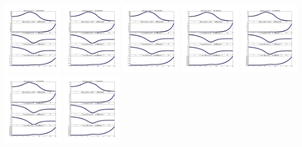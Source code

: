 \documentclass[11pt]{article}
\begin{document}
\vskip 10pt 
\includegraphics[width=0.19\textwidth]{frame0041fig1.png}
\vskip 10pt 
\includegraphics[width=0.19\textwidth]{frame0042fig1.png}
\vskip 10pt 
\includegraphics[width=0.19\textwidth]{frame0043fig1.png}
\vskip 10pt 
\includegraphics[width=0.19\textwidth]{frame0044fig1.png}
\vskip 10pt 
\includegraphics[width=0.19\textwidth]{frame0045fig1.png}
\vskip 10pt 
\includegraphics[width=0.19\textwidth]{frame0046fig1.png}
\vskip 10pt 
\includegraphics[width=0.19\textwidth]{frame0047fig1.png}
\end{document}
